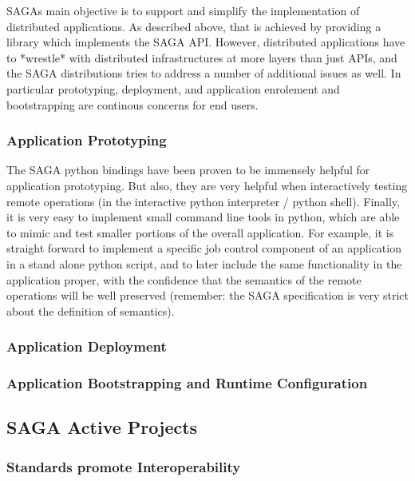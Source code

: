 \documentclass[12pt]{article}
\begin{document}
  SAGAs main objective is to support and simplify the implementation
  of distributed applications.  As described above, that is achieved
  by providing a library which implements the SAGA API.  However,
  distributed applications have to *wrestle* with distributed
  infrastructures at more layers than just APIs, and the SAGA
  distributions tries to address a number of additional issues as
  well. In particular prototyping, deployment, and application
  enrolement and bootstrapping are continous concerns for end users.

  \subsubsection*{Application Prototyping}

   The SAGA python bindings have been proven to be immensely helpful
   for application prototyping.  But also, they are very helpful when
   interactively testing remote operations (in the interactive python
   interpreter / python shell).  Finally, it is very easy to implement
   small command line tools in python, which are able to mimic and
   test smaller portions of the overall application.  For example, it
   is straight forward to implement a specific job control component
   of an application in a stand alone python script, and to later
   include the same functionality in the application proper, with the
   confidence that the semantics of the remote operations will be well
   preserved (remember: the SAGA specification is very strict about
   the definition of semantics).


  \subsubsection*{Application Deployment}


  \subsubsection*{Application Bootstrapping and Runtime Configuration}


 \subsection{SAGA Active Projects}

 \subsubsection{Standards promote Interoperability}
\end{document}
